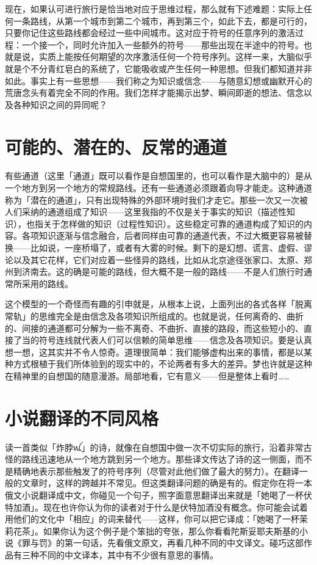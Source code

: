 \documentclass[
  12pt,
  twoside,
  openright,
  oldfontcommands,
]{memoir}
\begin{document}
现在，如果认可进行旅行是恰当地对应于思维过程，那么就有下述难题：实际上任何一条路线，从第一个城市到第二个城市，再到第三个，如此下去，都是可行的，只要你记住这些路线都会经过一些中间城市。这对应于符号的任意序列的激活过程：一个接一个，同时允许加入一些额外的符号------那些出现在半途中的符号。也就是说，实质上能按任何期望的次序激活任何一个符号序列。这样一来，大脑似乎就是个不分青红皂白的系统了，它能吸收或产生任何一种思想。但我们都知道并非如此。事实上有一些思想------我们称之为知识或信念------与随意幻想或幽默开心的荒唐念头有着完全不同的作用。我们怎样才能揭示出梦、瞬间即逝的想法、信念以及各种知识之间的异同呢？

\section{可能的、潜在的、反常的通道}

有些通道（这里「通道」既可以看作是自想国里的，也可以看作是大脑中的）是从一个地方到另一个地方的常规路线。还有一些通道必须跟着向导才能走。这种通道称为「潜在的通道」，只有出现特殊的外部环境时我们才走它。那些一次又一次被人们采纳的通道组成了知识------这里我指的不仅是关于事实的知识（描述性知识），也指关于怎样做的知识（过程性知识）。这些稳定可靠的通道构成了知识的内容。各项知识逐渐与信念融合，后者同样由可靠的通道代表，不过大概更容易被替换------比如说，一座桥塌了，或者有大雾的时候。剩下的是幻想、谎言、虚假、谬论以及其它花样，它们对应着一些怪异的路线，比如从北京途径张家口、太原、郑州到济南去。这的确是可能的路线，但大概不是一般的路线------不是人们旅行时通常所采用的路线。

这个模型的一个奇怪而有趣的引申就是，从根本上说，上面列出的各式各样「脱离常轨」的思维完全是由信念及各项知识所组成的。也就是说，任何离奇的、曲折的、间接的通道都可分解为一些不离奇、不曲折、直接的路段，而这些短小的、直接了当的符号连线就代表人们可以信赖的简单思维------信念及各项知识。要是认真想一想，这其实并不令人惊奇。道理很简单：我们能够虚构出来的事情，都是以某种方式根植于我们所体验到的现实中的，不论两者有多大的差异。梦也许就是这种在精神里的自想国的随意漫游。局部地看，它有意义------但是整体上看时\ldots\ldots{}

\section{小说翻译的不同风格}

读一首类似「炸脖{\gebfont ꪡ}」的诗，就像在自想国中做一次不切实际的旅行，沿着非常古怪的路线迅速地从一个地方跳到另一个地方。那些译文传达了诗的这一侧面，而不是精确地表示那些触发了的符号序列（尽管对此他们做了最大的努力）。在翻译一般的文章时，这样的跨越并不常见。但这类翻译问题的确是有的。假定你在将一本俄文小说翻译成中文，你碰见一个句子，照字面意思翻译出来就是「她喝了一杯伏特加酒」。现在也许你认为你的读者对于什么是伏特加酒没有概念。你可能会试着用他们的文化中「相应」的词来替代------这样，你可以把它译成：「她喝了一杯茉莉花茶」。如果你认为这个例子是个笨拙的夸张，那么你看看陀斯妥耶夫斯基的小说《罪与罚》的第一句话，先看俄文原文，再看几种不同的中文译文。碰巧这部作品有三种不同的中文译本，其中有不少很有意思的事情。
\end{document}

